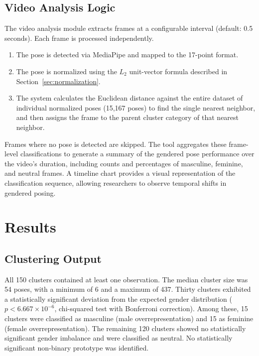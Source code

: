 \documentclass[12pt, a4paper]{article}
\begin{document}
\subsection{Video Analysis Logic}
\label{sec:video_logic}

The video analysis module extracts frames at a configurable interval (default: 0.5 seconds). Each frame is processed independently.

\begin{enumerate}[nosep]
    \item The pose is detected via MediaPipe and mapped to the 17-point format.
    \item The pose is normalized using the $L_2$ unit-vector formula described in Section~\ref{sec:normalization}.
    \item The system calculates the Euclidean distance against the entire dataset of individual normalized poses (15,167 poses) to find the single nearest neighbor, and then assigns the frame to the parent cluster category of that nearest neighbor.
\end{enumerate}

\noindent Frames where no pose is detected are skipped. The tool aggregates these frame-level classifications to generate a summary of the gendered pose performance over the video's duration, including counts and percentages of masculine, feminine, and neutral frames. A timeline chart provides a visual representation of the classification sequence, allowing researchers to observe temporal shifts in gendered posing.




\section{Results}
\label{sec:results}

\subsection{Clustering Output}
\label{sec:clustering_results}

All 150 clusters contained at least one observation. The median cluster size was 54 poses, with a minimum of 6 and a maximum of 437. Thirty clusters exhibited a statistically significant deviation from the expected gender distribution ($p < 6.667 \times 10^{-6}$, chi-squared test with Bonferroni correction). Among these, 15 clusters were classified as masculine (male overrepresentation) and 15 as feminine (female overrepresentation). The remaining 120 clusters showed no statistically significant gender imbalance and were classified as neutral. No statistically significant non-binary prototype was identified.
\end{document}
